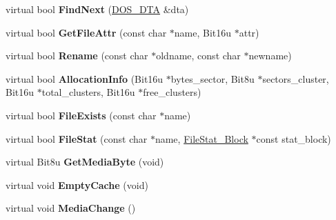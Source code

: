 \begin{DoxyCompactItemize}
\item 
\hypertarget{classisoDrive_ae425a68d6332c3f1fc1a463c42cc2d0d}{virtual bool {\bfseries Find\-Next} (\hyperlink{classDOS__DTA}{D\-O\-S\-\_\-\-D\-T\-A} \&dta)}\label{classisoDrive_ae425a68d6332c3f1fc1a463c42cc2d0d}

\item 
\hypertarget{classisoDrive_ace6b70797ab4d3950d5587f5539d5691}{virtual bool {\bfseries Get\-File\-Attr} (const char $\ast$name, Bit16u $\ast$attr)}\label{classisoDrive_ace6b70797ab4d3950d5587f5539d5691}

\item 
\hypertarget{classisoDrive_aa5f2e9221e3a3b6640c4473cf576121f}{virtual bool {\bfseries Rename} (const char $\ast$oldname, const char $\ast$newname)}\label{classisoDrive_aa5f2e9221e3a3b6640c4473cf576121f}

\item 
\hypertarget{classisoDrive_aaf6eb6eab4a4efb021a207f99d14c3e2}{virtual bool {\bfseries Allocation\-Info} (Bit16u $\ast$bytes\-\_\-sector, Bit8u $\ast$sectors\-\_\-cluster, Bit16u $\ast$total\-\_\-clusters, Bit16u $\ast$free\-\_\-clusters)}\label{classisoDrive_aaf6eb6eab4a4efb021a207f99d14c3e2}

\item 
\hypertarget{classisoDrive_a7b7b691f5e6d00978aaf23e50531094c}{virtual bool {\bfseries File\-Exists} (const char $\ast$name)}\label{classisoDrive_a7b7b691f5e6d00978aaf23e50531094c}

\item 
\hypertarget{classisoDrive_a8f1b1e00cc89546093bcc04fa52ae40c}{virtual bool {\bfseries File\-Stat} (const char $\ast$name, \hyperlink{structFileStat__Block}{File\-Stat\-\_\-\-Block} $\ast$const stat\-\_\-block)}\label{classisoDrive_a8f1b1e00cc89546093bcc04fa52ae40c}

\item 
\hypertarget{classisoDrive_aa6e11d3d3ef9179c7dde97199c03049a}{virtual Bit8u {\bfseries Get\-Media\-Byte} (void)}\label{classisoDrive_aa6e11d3d3ef9179c7dde97199c03049a}

\item 
\hypertarget{classisoDrive_a902191bc7beb70ecc14473dba805d409}{virtual void {\bfseries Empty\-Cache} (void)}\label{classisoDrive_a902191bc7beb70ecc14473dba805d409}

\item 
\hypertarget{classisoDrive_af2b985ba7bad0cb65c4fe0871a3d1b99}{virtual void {\bfseries Media\-Change} ()}\label{classisoDrive_af2b985ba7bad0cb65c4fe0871a3d1b99}


\end{DoxyCompactItemize}
